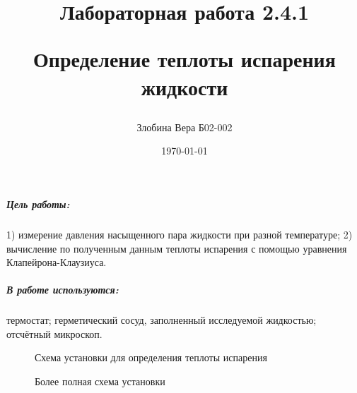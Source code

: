 \documentclass[a4paper,12pt]{article}
\author{Злобина Вера Б02-002}
\title{Лабораторная работа 2.4.1

Определение теплоты испарения жидкости}
\date{\today}
\begin{document}
	
\maketitle 
	
	
\newpage


\subparagraph*{Цель работы:}1) измерение давления насыщенного пара жидкости при разной температуре; 2) вычисление по полученным данным теплоты испарения с помощью уравнения Клапейрона-Клаузиуса. 
	
\subparagraph*{В работе используются:}термостат; герметический сосуд, заполненный исследуемой жидкостью; отсчётный микроскоп. 



\begin{figure}[h]	\label{plan1}
	
	\caption{Схема установки для определения теплоты испарения}

\end{figure}	

\begin{figure}[b!]	\label{plan2}
	
	\caption{Более полная схема установки}

\end{figure}
\end{document}

